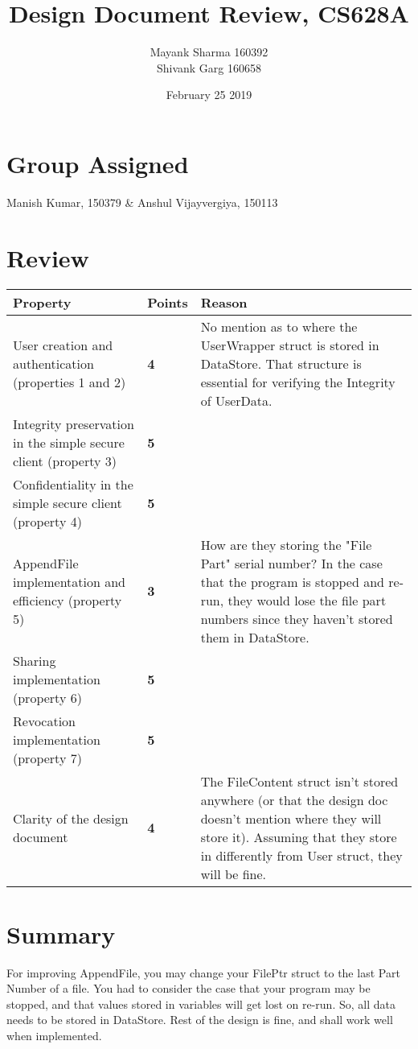 \documentclass[12pt, a4paper]{article}
\title{Design Document Review, CS628A}
\author{Mayank Sharma 160392\\ Shivank Garg 160658}
\date{February 25 2019}
\newcommand{\bo}{\textbf}
\begin{document}
\maketitle
\vspace{-3em}
\section{Group Assigned}
		 Manish Kumar, 150379 \& Anshul Vijayvergiya, 150113
\section{Review}

\begin{table}[ht]
	\begin{tabular}{|p{6cm}|p{1.2cm}|p{8cm}|}
        \hline
        \bo{Property} & \bo{Points} & \bo{Reason} \\
        \hline
	User creation and authentication (properties 1 and 2)& \bo{4}&
No mention as to where the UserWrapper struct is stored in DataStore. That structure is essential for verifying the Integrity of UserData.  
		\\ 
 	\hline
		Integrity preservation in the simple secure client (property 3)& \bo{5} & \\  
 	\hline
		Confidentiality in the simple secure client (property 4)& \bo{5} & \\  
 	\hline
	AppendFile implementation and efficiency (property 5)& \bo{3} & How are they storing the "File Part" serial number? In the case that the program is stopped and re-run, they would lose the file part numbers since they haven't stored them in DataStore.	\\  
 	\hline
		Sharing implementation (property 6)&\bo{5} & \\  
 	\hline
		Revocation implementation (property 7)& \bo{5}& \\  
 	\hline
		Clarity of the design document& \bo{4} & 
	
The FileContent struct isn't stored anywhere (or that the design doc doesn't mention where they will store it). Assuming that they store in differently from User struct, they will be fine. 
		\\  
 	\hline
	\end{tabular}
\end{table}
\section{Summary}
For improving AppendFile, you may change your FilePtr struct to the last Part Number of a file. 
You had to consider the case that your program may be stopped, and that values stored in variables will get lost on re-run. So, all data needs to be stored in DataStore. Rest of the design is fine, and shall work well when implemented.
\end{document}
